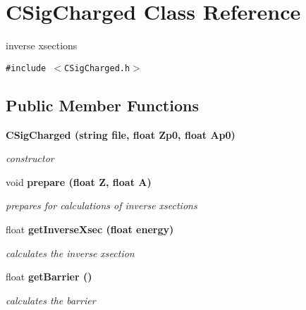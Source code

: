 \section{CSig\-Charged Class Reference}
\label{classCSigCharged}
inverse xsections  


{\tt \#include $<$CSig\-Charged.h$>$}

\subsection*{Public Member Functions}
\begin{CompactItemize}
\item 
\bf{CSig\-Charged} (string file, float Zp0, float Ap0)\label{classCSigCharged_f1a0c7d0b39115a3da7ba80d35633461}

\begin{CompactList}\small\item\em constructor \item\end{CompactList}\item 
void \bf{prepare} (float Z, float A)\label{classCSigCharged_1ff354f15be674a0cf48be6a8c92362a}

\begin{CompactList}\small\item\em prepares for calculations of inverse xsections \item\end{CompactList}\item 
float \bf{get\-Inverse\-Xsec} (float energy)\label{classCSigCharged_481a8b2ee84c4a2394396fc1ff3830bc}

\begin{CompactList}\small\item\em calculates the inverse xsection \item\end{CompactList}\item 
float \bf{get\-Barrier} ()\label{classCSigCharged_229a7e136b539bfe31ae313497f029ac}

\begin{CompactList}\small\item\em calculates the barrier \item\end{CompactList}\end{CompactItemize}

